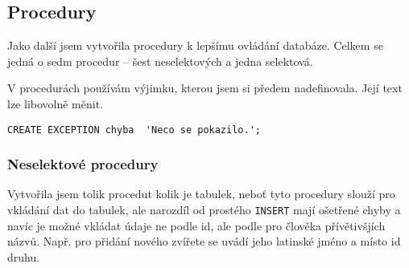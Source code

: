 \documentclass{article}
\begin{document}
\subsection{Procedury}

Jako další jsem vytvořila procedury k lepšímu ovládání databáze.
Celkem se jedná o sedm procedur -- šest neselektových a jedna selektová.

V procedurách používám výjimku, kterou jsem si předem nadefinovala. Její text lze libovolně měnit.
\begin{lstlisting}
CREATE EXCEPTION chyba  'Neco se pokazilo.';
\end{lstlisting}

\subsubsection{Neselektové procedury}
Vytvořila jsem tolik procedut kolik je tabulek, neboť tyto procedury slouží pro vkládání dat do tabulek, ale narozdíl od prostého \texttt{INSERT} mají ošetřené chyby a navíc je možné vkládat údaje ne podle id, ale podle pro člověka přívětivšjích názvů.
Např. pro přidání nového zvířete se uvádí jeho latinské jméno a místo id druhu.
\end{document}
